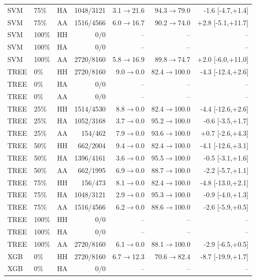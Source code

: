 \begin{longtable}{@{}llcrrrr@{}}
SVM & 75\% & HA & 1048/3121 & 3.1$\rightarrow$21.6 & 94.3$\rightarrow$79.0 & -1.6 [-4.7,+1.4] \\
SVM & 75\% & AA & 1516/4566 & 6.0$\rightarrow$16.7 & 90.2$\rightarrow$74.0 & +2.8 [-5.1,+11.7] \\
SVM & 100\% & HH & 0/0 & -- & -- & -- \\
SVM & 100\% & HA & 0/0 & -- & -- & -- \\
SVM & 100\% & AA & 2720/8160 & 5.8$\rightarrow$16.9 & 89.8$\rightarrow$74.7 & +2.0 [-6.0,+11.0] \\
TREE & 0\% & HH & 2720/8160 & 9.0$\rightarrow$0.0 & 82.4$\rightarrow$100.0 & -4.3 [-12.4,+2.6] \\
TREE & 0\% & HA & 0/0 & -- & -- & -- \\
TREE & 0\% & AA & 0/0 & -- & -- & -- \\
TREE & 25\% & HH & 1514/4530 & 8.8$\rightarrow$0.0 & 82.4$\rightarrow$100.0 & -4.4 [-12.6,+2.6] \\
TREE & 25\% & HA & 1052/3168 & 3.7$\rightarrow$0.0 & 95.2$\rightarrow$100.0 & -0.6 [-3.5,+1.7] \\
TREE & 25\% & AA & 154/462 & 7.9$\rightarrow$0.0 & 93.6$\rightarrow$100.0 & +0.7 [-2.6,+4.3] \\
TREE & 50\% & HH & 662/2004 & 9.4$\rightarrow$0.0 & 82.4$\rightarrow$100.0 & -4.1 [-12.6,+3.1] \\
TREE & 50\% & HA & 1396/4161 & 3.6$\rightarrow$0.0 & 95.5$\rightarrow$100.0 & -0.5 [-3.1,+1.6] \\
TREE & 50\% & AA & 662/1995 & 6.9$\rightarrow$0.0 & 88.7$\rightarrow$100.0 & -2.2 [-5.7,+1.1] \\
TREE & 75\% & HH & 156/473 & 8.1$\rightarrow$0.0 & 82.4$\rightarrow$100.0 & -4.8 [-13.0,+2.1] \\
TREE & 75\% & HA & 1048/3121 & 2.9$\rightarrow$0.0 & 95.3$\rightarrow$100.0 & -0.9 [-4.0,+1.3] \\
TREE & 75\% & AA & 1516/4566 & 6.2$\rightarrow$0.0 & 88.6$\rightarrow$100.0 & -2.6 [-5.9,+0.5] \\
TREE & 100\% & HH & 0/0 & -- & -- & -- \\
TREE & 100\% & HA & 0/0 & -- & -- & -- \\
TREE & 100\% & AA & 2720/8160 & 6.1$\rightarrow$0.0 & 88.1$\rightarrow$100.0 & -2.9 [-6.5,+0.5] \\
XGB & 0\% & HH & 2720/8160 & 6.7$\rightarrow$12.3 & 70.6$\rightarrow$82.4 & -8.7 [-19.9,+1.7] \\
XGB & 0\% & HA & 0/0 & -- & -- & -- \\

\end{longtable}
